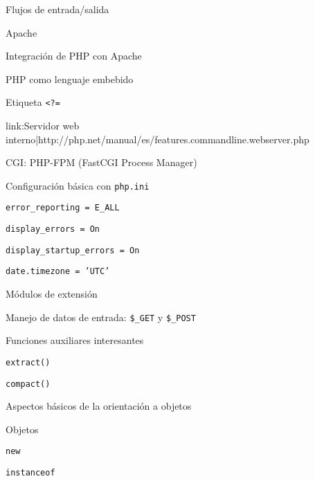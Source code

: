 \begin{longenum}
\begin{longenum}
\begin{longenum}
\begin{longenum}
                \item Flujos de entrada/salida
            \end{longenum}
            \item Apache
            \begin{longenum}
                \item Integración de PHP con Apache
                \item PHP como lenguaje embebido
                \item Etiqueta \texttt{<?=}
                \item [link:Servidor web  interno|http://php.net/manual/es/features.commandline.webserver.php]
            \end{longenum}
            \item CGI: PHP-FPM (FastCGI Process Manager)
            \item Configuración básica con \texttt{php.ini}
            \begin{longenum}
                \item \texttt{error\_reporting = E\_ALL}
                \item \texttt{display\_errors = On}
                \item \texttt{display\_startup\_errors = On}
                \item \texttt{date.timezone = 'UTC'}
            \end{longenum}
            \item Módulos de extensión
        \end{longenum}
        \item Manejo de datos de entrada: \texttt{\$\_GET} y \texttt{\$\_POST}
        \item Funciones auxiliares interesantes
        \begin{longenum}
            \item \texttt{extract()}
            \item \texttt{compact()}
        \end{longenum}
        \item Aspectos básicos de la orientación a objetos
        \begin{longenum}
            \item Objetos
            \begin{longenum}
                \item \texttt{new}
                \item \texttt{instanceof}
            \end{longenum}

\end{longenum}
\end{longenum}
\end{longenum}
